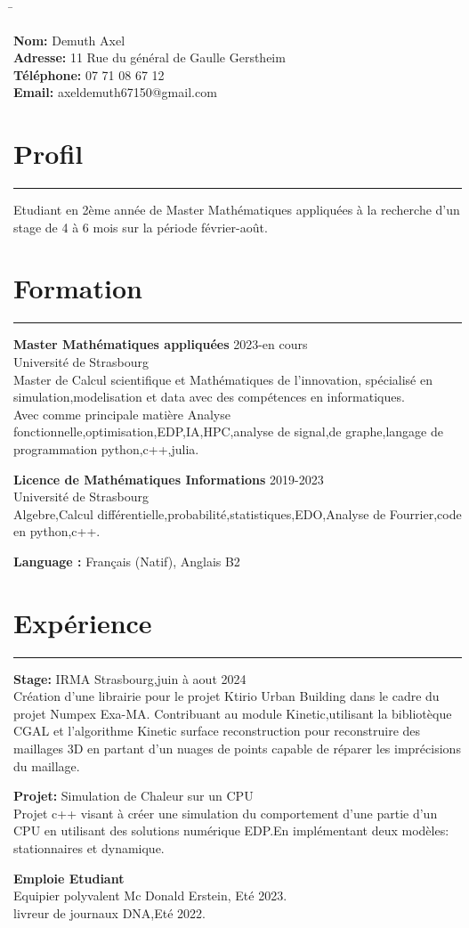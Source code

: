 \documentclass[a4paper,10pt]{article}
\newcommand{\personalinfo}[1]{
    \noindent
    \begin{tabbing}
    \hspace{2cm} \= \kill
    #1
    \end{tabbing}
}
\newcommand{\sectionline}{
    \noindent\rule{\textwidth}{0.5pt}
}
\begin{document}
\personalinfo{
    \textbf{Nom:} Demuth Axel \\
    \textbf{Adresse:} 11 Rue du général de Gaulle Gerstheim  \\
    \textbf{Téléphone:} 07 71 08 67 12 \\
    \textbf{Email:} axeldemuth67150@gmail.com
}

\section*{Profil}
\sectionline
Etudiant en 2ème année de Master Mathématiques appliquées à la recherche d'un stage de 4 à 6 mois sur la période février-août.\\

\section*{Formation}
\sectionline
\textbf{Master Mathématiques appliquées} 2023-en cours\\
Université de Strasbourg\\
Master de Calcul scientifique et Mathématiques de l'innovation, spécialisé en simulation,modelisation et data avec des compétences en informatiques.\\
Avec comme principale matière Analyse fonctionnelle,optimisation,EDP,IA,HPC,analyse de signal,de graphe,langage de programmation python,c++,julia.

\textbf{Licence de Mathématiques Informations} 2019-2023\\
Université de Strasbourg\\
Algebre,Calcul différentielle,probabilité,statistiques,EDO,Analyse de Fourrier,code en python,c++.

\textbf{Language :} 
Français (Natif), Anglais B2
\section*{Expérience}
\sectionline
\textbf{Stage: } IRMA Strasbourg,juin à aout 2024  \\
Création d'une librairie pour le projet Ktirio Urban Building dans le cadre du projet Numpex Exa-MA.
Contribuant au module Kinetic,utilisant la bibliotèque CGAL et l'algorithme Kinetic surface reconstruction 
pour reconstruire des maillages 3D en partant d'un nuages de points capable de réparer les imprécisions du maillage.

\noindent
\textbf{Projet: } Simulation de Chaleur sur un CPU\\
Projet c++ visant à créer une simulation du comportement d'une partie d'un CPU en utilisant des solutions numérique EDP.En implémentant deux modèles: stationnaires et dynamique.

\textbf{Emploie Etudiant} \\
Equipier polyvalent Mc Donald Erstein, Eté 2023.\\
livreur de journaux DNA,Eté 2022.
\end{document}
